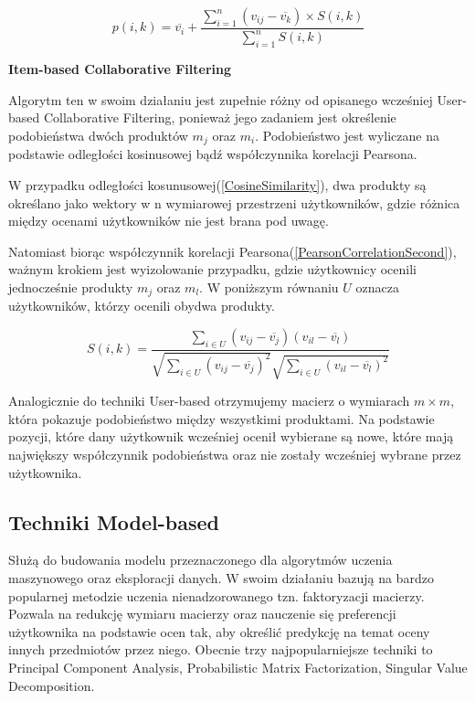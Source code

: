 \begin{equation}
\label{deviation}
p(i,k) = \overline{v_i} + 
\frac{
	\sum_{i=1}^{n} (v_{ij} - \overline{v_k}) \times S(i,k)
}{
	\sum_{i=1}^{n} S(i,k)
}
\end{equation}
 

\textbf{Item-based Collaborative Filtering}

Algorytm ten w swoim działaniu jest zupełnie różny od opisanego wcześniej User-based Collaborative Filtering, ponieważ jego zadaniem jest określenie podobieństwa dwóch produktów $m_j$ oraz $m_i$. Podobieństwo jest wyliczane na podstawie odległości kosinusowej bądź współczynnika korelacji Pearsona.

W przypadku odległości kosunusowej(\ref{CosineSimilarity}), dwa produkty są określano jako wektory w n wymiarowej przestrzeni użytkowników, gdzie różnica między ocenami użytkowników nie jest brana pod uwagę. 

Natomiast biorąc współczynnik korelacji Pearsona(\ref{PearsonCorrelationSecond}), ważnym krokiem jest wyizolowanie przypadku, gdzie użytkownicy ocenili jednocześnie produkty $m_j$ oraz $m_l$. W poniższym równaniu $U$ oznacza użytkowników, którzy ocenili obydwa produkty. 

\begin{equation}
\label{PearsonCorrelationSecond}
S(i,k) = \frac{
	\sum_{i \in U} (v_{ij} - \overline{v_j}) (v_{il} - \overline{v_l})
}{
	\sqrt{
		\sum_{i \in U} (v_{ij} - \overline{v_j})^2 
	}
	\sqrt{
	\sum_{i \in U} (v_{il} - \overline{v_l})^2
	}
}
\end{equation}

Analogicznie do techniki User-based otrzymujemy macierz o wymiarach $m \times m$, która pokazuje podobieństwo między wszystkimi produktami. Na podstawie pozycji, które dany użytkownik wcześniej ocenił wybierane są nowe, które mają największy współczynnik podobieństwa oraz nie zostały wcześniej wybrane przez użytkownika.

\newpage

\subsection{Techniki Model-based}

Służą do budowania modelu przeznaczonego dla algorytmów uczenia maszynowego oraz eksploracji danych. W swoim działaniu bazują na bardzo popularnej metodzie uczenia nienadzorowanego tzn. faktoryzacji macierzy. Pozwala na redukcję wymiaru macierzy oraz nauczenie się preferencji użytkownika na podstawie ocen tak, aby określić predykcję na temat oceny innych przedmiotów przez niego. Obecnie trzy najpopularniejsze techniki to Principal Component Analysis, Probabilistic Matrix Factorization, Singular Value Decomposition. 

